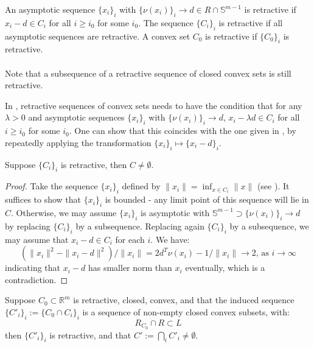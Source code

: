 \begin{defn}[Retractiveness]
	\label{defn:014-retractiveness}
	An asymptotic sequence $\{x_i\}_i$ with $\{\nu(x_i)\}_i\to d\in R\cap \mathbb{S}^{m-1}$ is retractive if $x_i-d\in C_i$ for all $i\geq i_0$ for some $i_0$. The sequence $\{C_i\}_i$ is retractive if all asymptotic sequences are retractive. A convex set $C_0$ is retractive if $\{C_0\}_i$ is retractive.
\end{defn}

\paragraph{}Note that a subsequence of a retractive sequence of closed convex sets is still retractive.

\begin{rmrk}
	In \cite{bertsekas2009convex}, retractive sequences of convex sets needs to have the condition that for any $\lambda >0$ and asymptotic sequences $\{x_i\}_i$ with $\{\nu(x_i)\}_i\to d$, $x_i-\lambda d\in C_i$ for all $i\geq i_0$ for some $i_0$. One can show that this coincides with the one given in , by repeatedly applying the transformation $\{x_i\}_i\mapsto \{x_i-d\}_i$.
\end{rmrk}

\begin{prop}
	\label{prop:014-non-empt-I}
	Suppose $\{C_i\}_i$ is retractive, then $C\neq\emptyset$.
\end{prop}

\begin{proof}
	Take the sequence $\{x_i\}_i$ defined by $\|x_i\|=\inf_{x\in C_i}\|x\|$ (see ). It suffices to show that $\{x_i\}_i$ is bounded - any limit point of this sequence will lie in $C$. Otherwise, we may assume $\{x_i\}_i$ is asymptotic with $\mathbb{S}^{m-1}\supset\{\nu(x_i)\}_i\to d$ by replacing $\{C_i\}_i$ by a subsequence. Replacing again $\{C_i\}_i$ by a subsequence, we may assume that $x_i-d\in C_i$ for each $i$. We have:
	\[
		\left(\|x_i\|^2-\|x_i-d\|^2\right)/\|x_i\|=2d^T\nu(x_i)-1/\|x_i\|\to 2\text{, as }i\to\infty
	\]
	indicating that $x_i-d$ has smaller norm than $x_i$ eventually, which is a contradiction.
\end{proof}

\begin{prop}\label{prop:014-non-empt-II}
	Suppose $C_0\subset \mathbb{R}^m$ is retractive, closed, convex, and that the induced sequence $\{C'_i\}_i:=\{C_0\cap C_i\}_i$ is a sequence of non-empty closed convex subsets, with:
	\[
		R_{C_0}\cap R\subset L
	\]
	then $\{C'_i\}_i$ is retractive, and that $C':=\bigcap_iC'_i\neq\emptyset$.
\end{prop}

